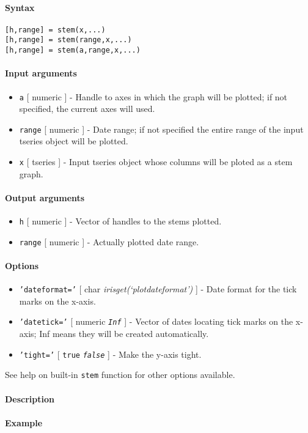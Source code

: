 


	\paragraph{Syntax}\label{syntax}

\begin{verbatim}
[h,range] = stem(x,...)
[h,range] = stem(range,x,...)
[h,range] = stem(a,range,x,...)
\end{verbatim}

\paragraph{Input arguments}\label{input-arguments}

\begin{itemize}
\item
  \texttt{a} {[} numeric {]} - Handle to axes in which the graph will be
  plotted; if not specified, the current axes will used.
\item
  \texttt{range} {[} numeric {]} - Date range; if not specified the
  entire range of the input tseries object will be plotted.
\item
  \texttt{x} {[} tseries {]} - Input tseries object whose columns will
  be ploted as a stem graph.
\end{itemize}

\paragraph{Output arguments}\label{output-arguments}

\begin{itemize}
\item
  \texttt{h} {[} numeric {]} - Vector of handles to the stems plotted.
\item
  \texttt{range} {[} numeric {]} - Actually plotted date range.
\end{itemize}

\paragraph{Options}\label{options}

\begin{itemize}
\item
  \texttt{'dateformat='} {[} char \textbar{}
  \emph{irisget(`plotdateformat')} {]} - Date format for the tick marks
  on the x-axis.
\item
  \texttt{'datetick='} {[} numeric \textbar{} \emph{\texttt{Inf}} {]} -
  Vector of dates locating tick marks on the x-axis; Inf means they will
  be created automatically.
\item
  \texttt{'tight='} {[} \texttt{true} \textbar{} \emph{\texttt{false}}
  {]} - Make the y-axis tight.
\end{itemize}

See help on built-in \texttt{stem} function for other options available.

\paragraph{Description}\label{description}

\paragraph{Example}\label{example}


